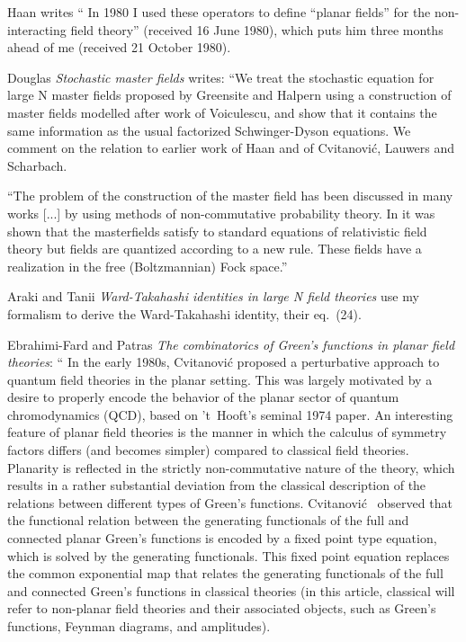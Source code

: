 \begin{description}
Haan writes `` In 1980 I used these operators to define ``planar fields''
for the non-interacting field theory'' (received 16 June
1980), which puts him three months ahead of me (received
21 October 1980).

Douglas {\em Stochastic master fields} writes: ``We treat
the stochastic equation for large N master fields proposed by Greensite
and Halpern using a construction of master fields modelled after work of
Voiculescu, and show that it contains the same information as the usual
factorized Schwinger-Dyson equations. We comment on the relation to
earlier work of Haan and of Cvitanovi\'c, Lauwers and
Scharbach.

``The problem of the construction of the master field has been discussed in
many works [...] by using methods of non-commutative
probability theory. In 
it was shown that the masterfields satisfy to standard equations of
relativistic field theory but fields are quantized according to a new
rule. These fields have a realization in the free (Boltzmannian)
Fock space.''

Araki and Tanii
{\em {Ward-Takahashi} identities in large {N} field theories}
use my formalism to derive the {Ward-Takahashi} identity,
their eq.~(24).

Ebrahimi-Fard and Patras
{\em The combinatorics of {Green}'s functions in planar field theories}:
`` In the early 1980s, Cvitanovi\'c \etal{} proposed
a perturbative approach to quantum field theories in the planar setting.
This was largely motivated by a desire to properly encode the behavior of
the planar sector of quantum chromodynamics (QCD), based on 't~Hooft's
seminal 1974 paper. An interesting feature of planar
field theories is the manner in which the calculus of symmetry factors
differs (and becomes simpler) compared to classical field theories.
Planarity is reflected in the strictly non-commutative nature of the
theory, which results in a rather substantial deviation from the
classical description of the relations between different types of Green's
functions. Cvitanovi\'c \etal\ observed that the functional relation
between the generating functionals of the full and connected planar
Green's functions is encoded by a fixed point type equation, which is
solved by the generating functionals. This fixed point equation replaces
the common exponential map that relates the generating functionals of the
full and connected Green's functions in classical theories (in this
article, classical will refer to non-planar field theories and their
associated objects, such as Green's functions, Feynman diagrams, and
amplitudes).


\end{description}
